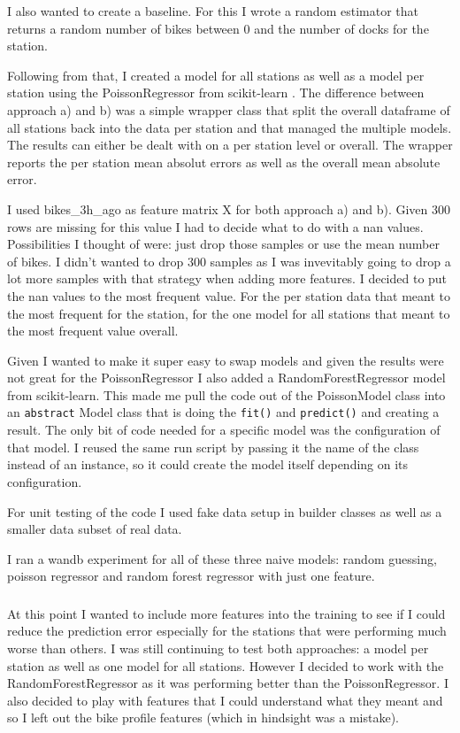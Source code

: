 \documentclass[a4paper]{article}
\begin{document}
    I also wanted to create a baseline. For this I wrote a random estimator that returns a random number of bikes between
    0 and the number of docks for the station.

    Following from that, I created a model for all stations as well as a model per station using the PoissonRegressor from
    scikit-learn \cite{scikit-learn}. The difference between approach a) and b) was a simple wrapper class that split the
    overall dataframe of all stations back into the data per station and that managed the multiple models. The results
    can either be dealt with on a per station level or overall. The wrapper reports the per station mean absolut errors
    as well as the overall mean absolute error.

    I used bikes\_3h\_ago as feature matrix X for both approach a) and b). Given 300 rows are missing for this value I had to decide what to do
    with a nan values. Possibilities I thought of were: just drop those samples or use the mean number of bikes. I didn't wanted
    to drop 300 samples as I was invevitably going to drop a lot more samples with that strategy when adding more features.
    I decided to put the nan values to the most frequent value. For the per station data that meant to the most frequent for
    the station, for the one model for all stations that meant to the most frequent value overall.

    Given I wanted to make it super easy to swap models and given the results were not great for the PoissonRegressor
    I also added a RandomForestRegressor model from scikit-learn. This made me pull the code out of the PoissonModel class
    into an \texttt{abstract} Model class that is doing the \texttt{fit()} and \texttt{predict()} and creating a result.
    The only bit of code needed for a specific model was the configuration of that model. I reused the same run script
    by passing it the name of the class instead of an instance, so it could create the model itself depending on its configuration.

    For unit testing of the code I used fake data setup in builder classes as well as a smaller data subset of real data.

    I ran a wandb experiment for all of these three naive models: random guessing, poisson regressor and random forest
    regressor with just one feature.

    \subsubsection*{}
    At this point I wanted to include more features into the training to see if I could reduce the prediction error
    especially for the stations that were performing much worse than others. I was still continuing to test both approaches:
    a model per station as well as one model for all stations. However I decided to work with the RandomForestRegressor
    as it was performing better than the PoissonRegressor. I also decided to play with features that I could understand
    what they meant and so I left out the bike profile features (which in hindsight was a mistake).
\end{document}
